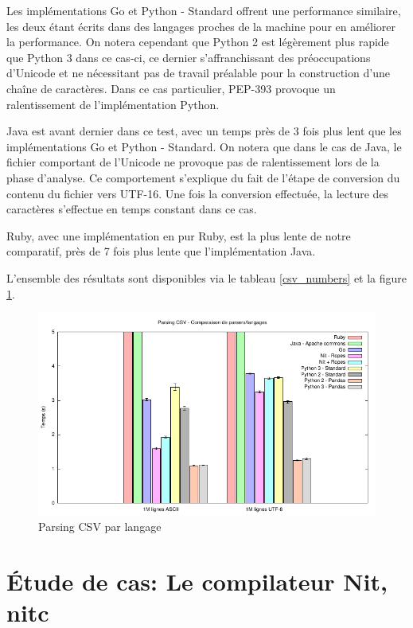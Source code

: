 Les implémentations Go et Python - Standard offrent une performance similaire, les deux étant écrits dans des langages
proches de la machine pour en améliorer la performance.
On notera cependant que Python 2 est légèrement plus rapide que Python 3 dans ce cas-ci, ce dernier s'affranchissant
des préoccupations d'Unicode et ne nécessitant pas de travail préalable pour la construction d'une chaîne de caractères.
Dans ce cas particulier, PEP-393 provoque un ralentissement de l'implémentation Python.

Java est avant dernier dans ce test, avec un temps près de 3 fois plus lent que les implémentations Go et
Python - Standard.
On notera que dans le cas de Java, le fichier comportant de l'Unicode ne provoque pas de ralentissement lors
de la phase d'analyse.
Ce comportement s'explique du fait de l'étape de conversion du contenu du fichier vers UTF-16.
Une fois la conversion effectuée, la lecture des caractères s'effectue en temps constant dans ce cas.

Ruby, avec une implémentation en pur Ruby, est la plus lente de notre comparatif, près de 7 fois plus
lente que l'implémentation Java.

L'ensemble des résultats sont disponibles via le tableau \ref{csv_numbers} et la figure \ref{csv_graph}.

\begin{figure}
	\caption{Parsing CSV par langage}
	\label{csv_graph}
	\centering
	\includegraphics[]{figures/csv_bench.pdf}
\end{figure}

\section{Étude de cas: Le compilateur Nit, nitc}

